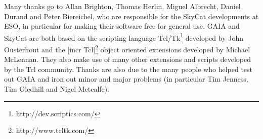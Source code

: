 \documentclass[twoside,11pt]{article}
\newcommand{\htmladdnormallinkfoot}[2]{#1\footnote{#2}}
\newcommand{\htmladdnormallink}[2]{#1}
\renewcommand{\_}{\texttt{\symbol{95}}}
\begin{document}
Many thanks go to Allan Brighton, Thomas Herlin, Miguel Albrecht,
Daniel Durand and Peter Biereichel, who are responsible for the
\htmladdnormallink{SkyCat}{http://archive.eso.org/skycat/}
developments at ESO, in particular for making their software free for
general use.
GAIA and SkyCat are both based on the scripting language
\htmladdnormallinkfoot{Tcl/Tk}{http://dev.scriptics.com/} developed by
John Ousterhout and the \htmladdnormallinkfoot{[incr Tcl]}
{http://www.tcltk.com/} object oriented extensions developed by
Michael McLennan.
They also make use of many other extensions and scripts developed by
the Tcl community.
Thanks are also due to the many people who helped test out GAIA and
iron out minor and major problems (in particular Tim Jenness, Tim
Gledhill and Nigel Metcalfe).

\end{document}
